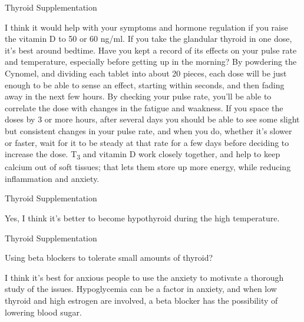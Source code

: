 \documentclass[11pt,oneside,openany,extrafontsizes]{memoir}
\begin{document}
\begin{standalonequote}{Thyroid Supplementation}

    \begin{answer}
      I think it would help with your symptoms and hormone regulation if you raise the vitamin D to 50 or 60 ng/ml. If you take the glandular thyroid in one dose, it's best around bedtime. Have you kept a record of its effects on your pulse rate and temperature, especially before getting up in the morning? By powdering the Cynomel, and dividing each tablet into about 20 pieces, each dose will be just enough to be able to sense an effect, starting within seconds, and then fading away in the next few hours. By checking your pulse rate, you'll be able to correlate the dose with changes in the fatigue and waakness. If you space the doses by 3 or more hours, after several days you should be able to see some slight but consistent changes in your pulse rate, and when you do, whether it's slower or faster, wait for it to be steady at that rate for a few days before deciding to increase the dose. T\textsubscript{3} and vitamin D work closely together, and help to keep calcium out of soft tissues; that lets them store up more energy, while reducing inflammation and anxiety.
    \end{answer}
\end{standalonequote}

\begin{standalonequote}{Thyroid Supplementation}

    \begin{answer}
      Yes, I think it's better to become hypothyroid during the high temperature.
    \end{answer}
\end{standalonequote}

\begin{qaexchange}{Thyroid Supplementation}

    \begin{question}
        Using beta blockers to tolerate small amounts of thyroid?
    \end{question}

    \begin{answer}
      I think it's best for anxious people to use the anxiety to motivate a thorough study of the issues. Hypoglycemia can be a factor in anxiety, and when low thyroid and high estrogen are involved, a beta blocker has the possibility of lowering blood sugar.
    \end{answer}
\end{qaexchange}
\end{document}
